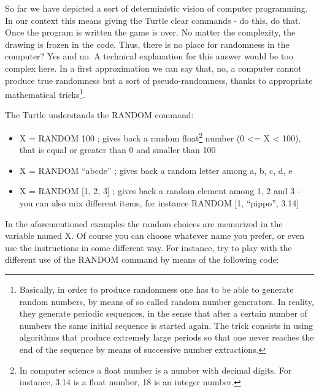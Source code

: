 So far we have depicted a sort of deterministic vision of computer programming. In our context this means giving the Turtle clear commands - do this, do that. Once the program is written the game is over. No matter the complexity, the drawing is frozen in the code. Thus, there is no place for randomness in the computer? Yes and no. A technical explanation for this answer would be too complex here. In a first approximation we can say that, no, a computer cannot produce true randomness but a sort of pseudo-randomness, thanks to appropriate mathematical tricks\footnote{Basically, in order to produce randomness one has to be able to generate random numbers, by means of so called random number generators. In reality, they generate periodic sequences, in the sense that after a certain number of numbers the same initial sequence is started again. The trick consists in using algorithms that produce extremely large periods so that one never reaches the end of the sequence by means of successive number extractions.}.

The Turtle understands the RANDOM command:

\begin{itemize}
\item X = RANDOM 100 ; gives back a random float\footnote{In computer science a float number is a number with decimal digits. For instance, 3.14 is a float number, 18 is an integer number.} number (0 <= X < 100), that is equal or greater than 0 and smaller than 100
\item X = RANDOM “abcde” ; gives back a random letter among a, b, c, d, e
\item X = RANDOM [1, 2, 3] ; gives back a random element among 1, 2 and 3 - you can also mix different items, for instance RANDOM [1, “pippo”, 3.14]
\end{itemize}

In the aforementioned examples the random choices are memorized in the variable named X. Of course you can choose whatever name you prefer, or even use the instructions in some different way. For instance, try to play with the different use of the RANDOM command by means of the following code:

\vskip 1cm

